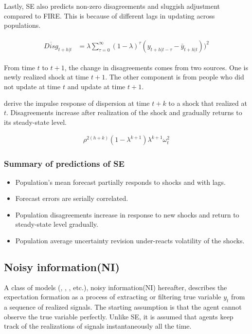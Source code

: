 \documentclass[12pt]{article}
\begin{document}
	Lastly, SE also predicts non-zero disagreements and sluggish adjustment compared to FIRE. This is because of different lags in updating across populations. 
	
	\begin{eqnarray}\label{DisgSEPop}
		\begin{aligned}
			\overline{Disg}_{t+h|t} & = \lambda \sum^{\infty}_{\tau=0} (1-\lambda)^{\tau} (y_{t+h|t-\tau} - \bar y_{t+h|t }))^2  
		\end{aligned}
	\end{eqnarray}
	
	From time $t$ to $t+1$, the change in disagreements comes from two sources. One is newly realized shock at time $t+1$. The other component is from people who did not update at time $t$ and update at time $t+1$.  
	
\citet{coibion2012can} derive the impulse response of dispersion at time $t+k$ to a shock that realized at $t$. Disagreements increase after realization of the shock and gradually returns to its steady-state level.  
	
	\begin{eqnarray}
		\rho^{2(h+k)} (1-\lambda^{k+1})\lambda^{k+1} \omega^2_t
	\end{eqnarray}
	
	\subsubsection{Summary of predictions of SE}
	
	\begin{itemize}
		\item Population's mean forecast partially responds to shocks and with lags. 
		\item Forecast errors are serially correlated. 
		\item Population disagreements increase in response to new shocks and return to steady-state level gradually. 
		\item Population average uncertainty revision under-reacts volatility of the shocks.
	\end{itemize}
	
	\subsection{Noisy information(NI)}
	
	A class of models (\citet{lucas1972expectations}, \citet{sims2003implications}, \cite{woodford2001imperfect}, etc.), noisy information(NI) hereafter, describes the expectation formation as a process of extracting or filtering true variable $y_t$ from a sequence of realized signals.  The starting assumption is that the agent cannot observe the true variable perfectly. Unlike SE, it is assumed that agents keep track of the realizations of signals instantaneously all the time. 
	
\end{document}
